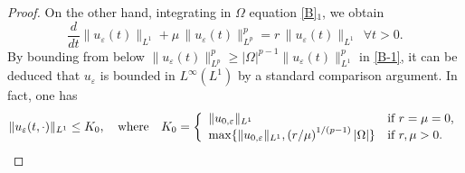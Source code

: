 \documentclass[11pt,reqno]{amsart}%
\numberwithin{equation}{section}
\begin{document}
{\begin{proof}
On the other hand, integrating in $\Omega$ equation \eqref{B}$_1$, 
we obtain
\begin{equation}\label{B-1}
\frac{d}{dt} \|u_{\varepsilon}(t)\|_{L^1}
+  \mu\, \|u_{\varepsilon}(t)\|_{L^p}^p 
=
r\, \|u_{\varepsilon}(t)\|_{L^1} 
\ \ \forall t>0.
\end{equation}
By bounding from below $\|u_{\varepsilon}(t)\|_{L^p}^p \ge |\Omega| ^{p-1}
\|u_{\varepsilon}(t)\|_{L^1}^p$ in \eqref{B-1}, it can be deduced that $u_\varepsilon$ is bounded in $L^\infty(L^1)$ by a standard comparison argument. In fact, one has 
\begin{equation}\label{L1-u}
\Vert u_\varepsilon(t,\cdot) \Vert_{L^1} \le K_0, 
\quad \hbox{where} \quad 
K_0=
\left\{
\begin{array}{ll}
  \Vert u_{0,\varepsilon} \Vert_{L^1} &  \hbox{if $r=\mu=0$,}    \\
  \max\{\Vert u_{0,\varepsilon} \Vert_{L^1},\left(r/\mu\right)^{{1}/{(p-1)}} \vert \Omega \vert \} &    \hbox{if $r,\mu>0$.} 
\end{array}
\right.
\end{equation}


\end{proof}}
\end{document}
